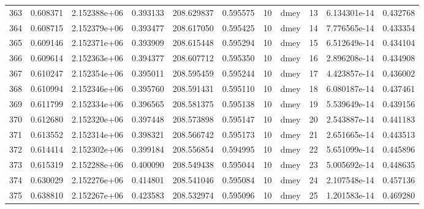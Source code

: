 \begin{tabular}{lrrrrrrlrrr}
363  &    0.608371 &        2.152388e+06 &  0.393133 &              208.629837 &    0.595575 &      10 &         dmey &     13 &   6.134301e-14 &      0.432768 \\
364  &    0.608715 &        2.152379e+06 &  0.393477 &              208.617050 &    0.595425 &      10 &         dmey &     14 &   7.776565e-14 &      0.433354 \\
365  &    0.609146 &        2.152371e+06 &  0.393909 &              208.615448 &    0.595294 &      10 &         dmey &     15 &   6.512649e-14 &      0.434104 \\
366  &    0.609614 &        2.152363e+06 &  0.394377 &              208.607712 &    0.595350 &      10 &         dmey &     16 &   2.896208e-14 &      0.434908 \\
367  &    0.610247 &        2.152354e+06 &  0.395011 &              208.595459 &    0.595244 &      10 &         dmey &     17 &   4.423857e-14 &      0.436002 \\
368  &    0.610994 &        2.152346e+06 &  0.395760 &              208.591431 &    0.595110 &      10 &         dmey &     18 &   6.080187e-14 &      0.437461 \\
369  &    0.611799 &        2.152334e+06 &  0.396565 &              208.581375 &    0.595138 &      10 &         dmey &     19 &   5.539649e-14 &      0.439156 \\
370  &    0.612680 &        2.152320e+06 &  0.397448 &              208.573898 &    0.595147 &      10 &         dmey &     20 &   2.543887e-14 &      0.441183 \\
371  &    0.613552 &        2.152314e+06 &  0.398321 &              208.566742 &    0.595173 &      10 &         dmey &     21 &   2.651665e-14 &      0.443513 \\
372  &    0.614414 &        2.152302e+06 &  0.399184 &              208.556854 &    0.594995 &      10 &         dmey &     22 &   5.651099e-14 &      0.445896 \\
373  &    0.615319 &        2.152288e+06 &  0.400090 &              208.549438 &    0.595044 &      10 &         dmey &     23 &   5.005692e-14 &      0.448635 \\
374  &    0.630029 &        2.152276e+06 &  0.414801 &              208.541046 &    0.595084 &      10 &         dmey &     24 &   2.107548e-14 &      0.457136 \\
375  &    0.638810 &        2.152267e+06 &  0.423583 &              208.532974 &    0.595096 &      10 &         dmey &     25 &   1.201583e-14 &      0.469280 \\

\end{tabular}
